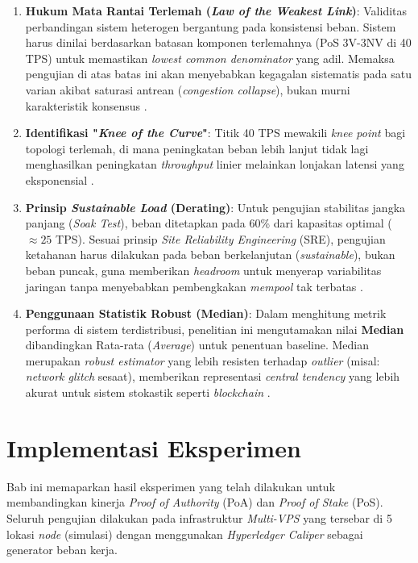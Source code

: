\begin{enumerate}
    \item \textbf{Hukum Mata Rantai Terlemah (\textit{Law of the Weakest Link})}:
    Validitas perbandingan sistem heterogen bergantung pada konsistensi beban. Sistem harus dinilai berdasarkan batasan komponen terlemahnya (PoS 3V-3NV di 40 TPS) untuk memastikan \textit{lowest common denominator} yang adil. Memaksa pengujian di atas batas ini akan menyebabkan kegagalan sistematis pada satu varian akibat saturasi antrean (\textit{congestion collapse}), bukan murni karakteristik konsensus \cite{huffman2020}.

    \item \textbf{Identifikasi "\textit{Knee of the Curve}"}:
    Titik 40 TPS mewakili \textit{knee point} bagi topologi terlemah, di mana peningkatan beban lebih lanjut tidak lagi menghasilkan peningkatan \textit{throughput} linier melainkan lonjakan latensi yang eksponensial \cite{spillner2019}.

    \item \textbf{Prinsip \textit{Sustainable Load} (Derating)}:
    Untuk pengujian stabilitas jangka panjang (\textit{Soak Test}), beban ditetapkan pada 60\% dari kapasitas optimal ($\approx 25$ TPS). Sesuai prinsip \textit{Site Reliability Engineering} (SRE), pengujian ketahanan harus dilakukan pada beban berkelanjutan (\textit{sustainable}), bukan beban puncak, guna memberikan \textit{headroom} untuk menyerap variabilitas jaringan tanpa menyebabkan pembengkakan \textit{mempool} tak terbatas \cite{googleSRE2016, spec2019}.

    \item \textbf{Penggunaan Statistik Robust (Median)}:
    Dalam menghitung metrik performa di sistem terdistribusi, penelitian ini mengutamakan nilai \textbf{Median} dibandingkan Rata-rata (\textit{Average}) untuk penentuan baseline. Median merupakan \textit{robust estimator} yang lebih resisten terhadap \textit{outlier} (misal: \textit{network glitch} sesaat), memberikan representasi \textit{central tendency} yang lebih akurat untuk sistem stokastik seperti \textit{blockchain} \cite{rousseeuw1993}.
\end{enumerate}

\section{Implementasi Eksperimen}

Bab ini memaparkan hasil eksperimen yang telah dilakukan untuk membandingkan kinerja \textit{Proof of Authority} (PoA) dan \textit{Proof of Stake} (PoS). Seluruh pengujian dilakukan pada infrastruktur \textit{Multi-VPS} yang tersebar di 5 lokasi \textit{node} (simulasi) dengan menggunakan \textit{Hyperledger Caliper} sebagai generator beban kerja.

